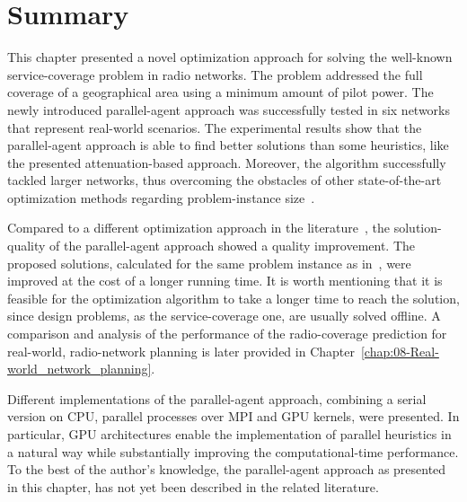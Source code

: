 \section{Summary}

This chapter presented a novel optimization approach for solving the
well-known service-coverage problem in radio networks. The problem
addressed the full coverage of a geographical area using a minimum
amount of pilot power. The newly introduced parallel-agent approach
was successfully tested in six networks that represent real-world
scenarios. The experimental results show that the parallel-agent approach
is able to find better solutions than some heuristics, like the presented
attenuation-based approach. Moreover, the algorithm successfully tackled
larger networks, thus overcoming the obstacles of other state-of-the-art
optimization methods regarding problem-instance size~\cite{Siomina_Pilot.power.optimization:2004,Siomina:Minimum.pilot.power.for.service.coverage}.

Compared to a different optimization approach in the literature~\cite{Siomina:Minimum.pilot.power.for.service.coverage},
the solution-quality of the parallel-agent approach showed a quality
improvement. The proposed solutions, calculated for the same problem
instance as in~\cite{Siomina:Minimum.pilot.power.for.service.coverage},
were improved at the cost of a longer running time. It is worth mentioning
that it is feasible for the optimization algorithm to take a longer
time to reach the solution, since design problems, as the service-coverage
one, are usually solved offline. A comparison and analysis of the
performance of the radio-coverage prediction for real-world, radio-network
planning is later provided in Chapter~\ref{chap:08-Real-world_network_planning}.

Different implementations of the parallel-agent approach, combining
a serial version on CPU, parallel processes over MPI and GPU kernels,
were presented. In particular, GPU architectures enable the implementation
of parallel heuristics in a natural way while substantially improving
the computational-time performance. To the best of the author's knowledge,
the parallel-agent approach as presented in this chapter, has not
yet been described in the related literature.
